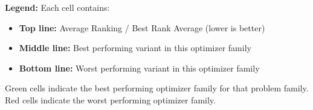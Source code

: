 \vspace{0.5em}
\textbf{Legend:} Each cell contains:
\begin{itemize}
\item \textbf{Top line:} Average Ranking / Best Rank Average (lower is better)
\item \textbf{Middle line:} Best performing variant in this optimizer family
\item \textbf{Bottom line:} Worst performing variant in this optimizer family
\end{itemize}
\textcolor{bestgreen}{Green cells} indicate the best performing optimizer family for that problem family.
\textcolor{worstred}{Red cells} indicate the worst performing optimizer family.
